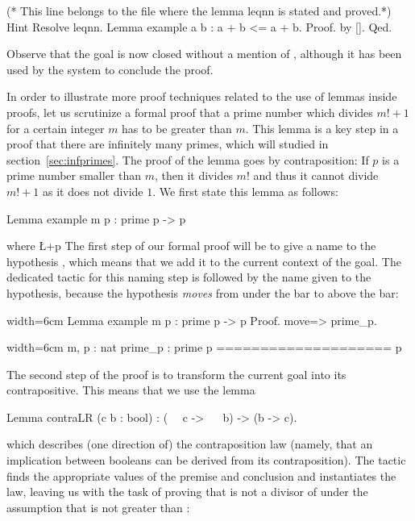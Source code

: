 \begin{coq}{}{}
(* This line belongs to the file where the lemma leqnn is stated and proved.*)
Hint Resolve leqnn.
Lemma example a b : a + b <= a + b.
Proof.  by [].  Qed.
\end{coq}
Observe that the goal is now closed without a mention of ,
although it has been used by the system to conclude the proof.

In order to illustrate more proof techniques related to the use of
lemmas inside proofs, let us scrutinize a formal proof that a prime
number which divides $m! + 1$ for a certain integer $m$ has to be
greater than $m$. This lemma is a key step in a proof that there are
infinitely many primes, which will studied in
section~\ref{sec:infprimes}. The proof of the lemma goes by
contraposition: If $p$ is a prime number smaller than $m$, then it
divides $m!$ and thus it cannot divide $m! + 1$ as it does not divide
$1$. We first state this lemma as follows:

\begin{coq}{}{}
Lemma example m p : prime p -> p %
\end{coq}
where \L+p %
The first step of our formal proof will be to give a name to the
hypothesis , which means that we add it to the
current context of the goal. The dedicated tactic for this naming step is
 followed by the name given to the hypothesis, because the
hypothesis \emph{moves} from under the bar to above the bar:

\begin{coq}{}{width=6cm}
Lemma example m p : prime p ->
  p %
Proof.
move=> prime_p.
\end{coq}
\begin{coqout}{}{width=6cm}
m, p : nat
prime_p : prime p
====================
p %
\end{coqout}
The second step of the proof is to transform the current goal into its
contrapositive. This means that we use the lemma

\begin{coq}{}{}
Lemma contraLR (c b : bool) :  (~~ c -> ~~ b) -> (b -> c).
\end{coq}

which describes (one direction of) the contraposition law (namely,
that an implication between booleans can be derived from its
contraposition). The  tactic
finds the appropriate values of the premise and conclusion and
instantiates the law, leaving us with the task of proving
that  is not a
divisor of  under the assumption that  is not
greater than :

